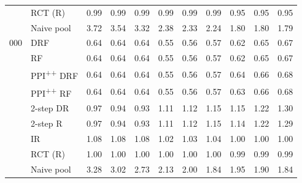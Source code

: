 \begin{table}[h]
\begin{center}
\begin{tabular}{@{}llccccccccc@{}}
 & RCT (R) & 0.99 & 0.99 & 0.99 & 0.99 & 0.99 & 0.99 & 0.95 & 0.95 & 0.95 \\
 & Naive pool & 3.72 & 3.54 & 3.32 & 2.38 & 2.33 & 2.24 & 1.80 & 1.80 & 1.79 \\
\addlinespace
3{,}000 & DRF & 0.64 & 0.64 & 0.64 & 0.55 & 0.56 & 0.57 & 0.62 & 0.65 & 0.67 \\
 & RF & 0.64 & 0.64 & 0.64 & 0.55 & 0.56 & 0.57 & 0.62 & 0.65 & 0.67 \\
 & PPI\textsuperscript{++} DRF & 0.64 & 0.64 & 0.64 & 0.55 & 0.56 & 0.57 & 0.64 & 0.66 & 0.68 \\
 & PPI\textsuperscript{++} RF & 0.64 & 0.64 & 0.64 & 0.55 & 0.56 & 0.57 & 0.63 & 0.66 & 0.68 \\
 & 2-step DR & 0.97 & 0.94 & 0.93 & 1.11 & 1.12 & 1.15 & 1.15 & 1.22 & 1.30 \\
 & 2-step R & 0.97 & 0.94 & 0.93 & 1.11 & 1.12 & 1.15 & 1.14 & 1.22 & 1.29 \\
 & IR & 1.08 & 1.08 & 1.08 & 1.02 & 1.03 & 1.04 & 1.00 & 1.00 & 1.00 \\
 & RCT (R) & 1.00 & 1.00 & 1.00 & 1.00 & 1.00 & 1.00 & 0.99 & 0.99 & 0.99 \\
 & Naive pool & 3.28 & 3.02 & 2.73 & 2.13 & 2.00 & 1.84 & 1.95 & 1.90 & 1.84 \\
\bottomrule
\end{tabular}
\end{center}
\end{table}
